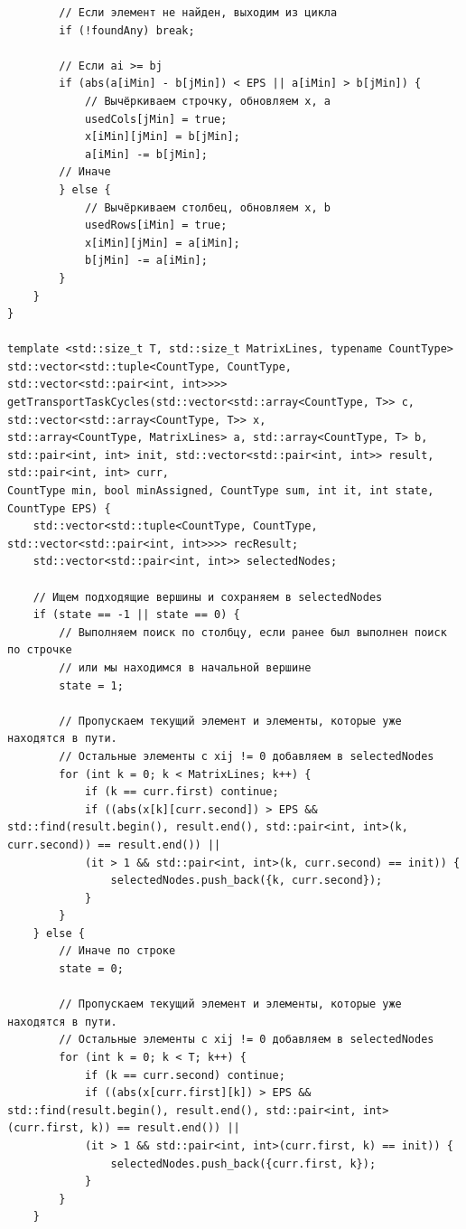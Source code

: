 \documentclass[a4paper,14pt]{extarticle}
\begin{document}
\begin{verbatim}
        // Если элемент не найден, выходим из цикла
        if (!foundAny) break;

        // Если ai >= bj
        if (abs(a[iMin] - b[jMin]) < EPS || a[iMin] > b[jMin]) {
            // Вычёркиваем строчку, обновляем x, a
            usedCols[jMin] = true;
            x[iMin][jMin] = b[jMin];
            a[iMin] -= b[jMin];
        // Иначе
        } else {
            // Вычёркиваем столбец, обновляем x, b
            usedRows[iMin] = true;
            x[iMin][jMin] = a[iMin];
            b[jMin] -= a[iMin];
        }
    }
}

template <std::size_t T, std::size_t MatrixLines, typename CountType>
std::vector<std::tuple<CountType, CountType, std::vector<std::pair<int, int>>>> getTransportTaskCycles(std::vector<std::array<CountType, T>> c, std::vector<std::array<CountType, T>> x, 
std::array<CountType, MatrixLines> a, std::array<CountType, T> b, std::pair<int, int> init, std::vector<std::pair<int, int>> result, std::pair<int, int> curr,
CountType min, bool minAssigned, CountType sum, int it, int state, CountType EPS) {
    std::vector<std::tuple<CountType, CountType, std::vector<std::pair<int, int>>>> recResult;
    std::vector<std::pair<int, int>> selectedNodes;

    // Ищем подходящие вершины и сохраняем в selectedNodes
    if (state == -1 || state == 0) {
        // Выполняем поиск по столбцу, если ранее был выполнен поиск по строчке
        // или мы находимся в начальной вершине
        state = 1;
        
        // Пропускаем текущий элемент и элементы, которые уже находятся в пути. 
        // Остальные элементы с xij != 0 добавляем в selectedNodes
        for (int k = 0; k < MatrixLines; k++) {
            if (k == curr.first) continue;
            if ((abs(x[k][curr.second]) > EPS && std::find(result.begin(), result.end(), std::pair<int, int>(k, curr.second)) == result.end()) || 
            (it > 1 && std::pair<int, int>(k, curr.second) == init)) {
                selectedNodes.push_back({k, curr.second});
            } 
        }
    } else {
        // Иначе по строке
        state = 0;
        
        // Пропускаем текущий элемент и элементы, которые уже находятся в пути. 
        // Остальные элементы с xij != 0 добавляем в selectedNodes
        for (int k = 0; k < T; k++) {
            if (k == curr.second) continue;
            if ((abs(x[curr.first][k]) > EPS && std::find(result.begin(), result.end(), std::pair<int, int>(curr.first, k)) == result.end()) || 
            (it > 1 && std::pair<int, int>(curr.first, k) == init)) {
                selectedNodes.push_back({curr.first, k});
            } 
        }
    }


\end{verbatim}
\end{document}

